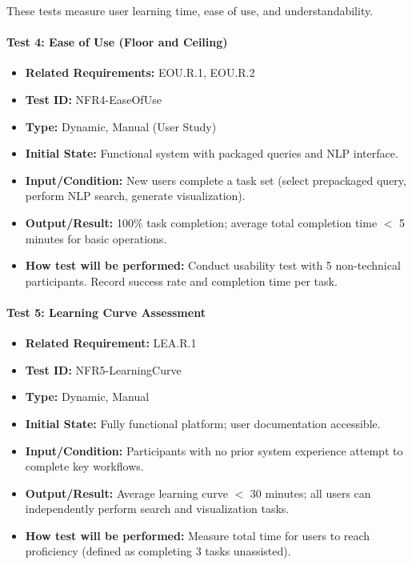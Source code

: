 \documentclass[12pt, titlepage]{article}
\begin{document}
These tests measure user learning time, ease of use, and understandability.

\paragraph{Test 4: Ease of Use (Floor and Ceiling)}
\begin{itemize}
    \item \textbf{Related Requirements:} EOU.R.1, EOU.R.2
    \item \textbf{Test ID:} NFR4-EaseOfUse
    \item \textbf{Type:} Dynamic, Manual (User Study)
    \item \textbf{Initial State:} Functional system with packaged queries and NLP interface.
    \item \textbf{Input/Condition:} New users complete a task set (select prepackaged query, perform NLP search, generate visualization).
    \item \textbf{Output/Result:} 100\% task completion; average total completion time $<$ 5 minutes for basic operations.
    \item \textbf{How test will be performed:} Conduct usability test with 5 non-technical participants. Record success rate and completion time per task.
\end{itemize}

\paragraph{Test 5: Learning Curve Assessment}
\begin{itemize}
    \item \textbf{Related Requirement:} LEA.R.1
    \item \textbf{Test ID:} NFR5-LearningCurve
    \item \textbf{Type:} Dynamic, Manual
    \item \textbf{Initial State:} Fully functional platform; user documentation accessible.
    \item \textbf{Input/Condition:} Participants with no prior system experience attempt to complete key workflows.
    \item \textbf{Output/Result:} Average learning curve $<$ 30 minutes; all users can independently perform search and visualization tasks.
    \item \textbf{How test will be performed:} Measure total time for users to reach proficiency (defined as completing 3 tasks unassisted).
\end{itemize}
\end{document}
